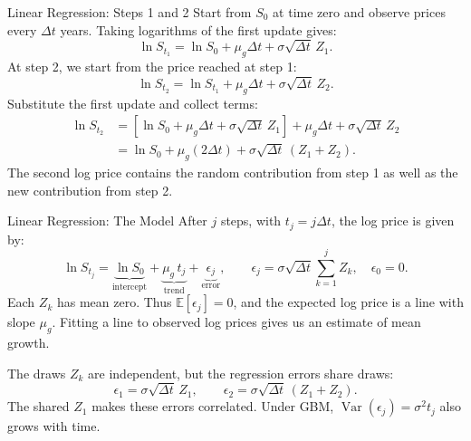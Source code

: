 \documentclass[aspectratio=169,11pt]{beamer}
\newcommand{\E}{\mathbb{E}}
\newcommand{\Var}{\operatorname{Var}}
\newcommand{\mug}{\mu_g}
\begin{document}
\begin{frame}{Linear Regression: Steps 1 and 2}
  Start from $S_0$ at time zero and observe prices every $\Delta t$ years.
  Taking logarithms of the first update gives:
  \[
    \ln S_{t_1}=\ln S_0+\mug\Delta t+\sigma\sqrt{\Delta t}\,Z_1.
  \]
  At step 2, we start from the price reached at step 1:
  \[
    \ln S_{t_2}=\ln S_{t_1}+\mug\Delta t+\sigma\sqrt{\Delta t}\,Z_2.
  \]
  Substitute the first update and collect terms:
  \[
    \begin{aligned}
      \ln S_{t_2}
      &=\left[\ln S_0+\mug\Delta t+\sigma\sqrt{\Delta t}\,Z_1\right]
        +\mug\Delta t+\sigma\sqrt{\Delta t}\,Z_2\\
      &=\ln S_0+\mug(2\Delta t)+\sigma\sqrt{\Delta t}\,(Z_1+Z_2).
    \end{aligned}
  \]
  The second log price contains the random contribution from step 1
  as well as the new contribution from step 2.
\end{frame}

\begin{frame}{Linear Regression: The Model}
  After $j$ steps, with $t_j=j\Delta t$, the log price is given by:
  \[
    \ln S_{t_j}
    =\underbrace{\ln S_0}_{\text{intercept}}
    +\underbrace{\mug\,t_j}_{\text{trend}}
    +\underbrace{\epsilon_j}_{\text{error}},
    \qquad
    \epsilon_j=\sigma\sqrt{\Delta t}\sum_{k=1}^{j}Z_k,\quad \epsilon_0=0.
  \]
  Each $Z_k$ has mean zero. Thus $\E[\epsilon_j]=0$, and the expected log
  price is a line with slope $\mug$. Fitting a line to observed log prices
  gives us an estimate of mean growth.

  \vspace{0.5em}
  The draws $Z_k$ are independent, but the regression errors share draws:
  \[
    \epsilon_1=\sigma\sqrt{\Delta t}\,Z_1,
    \qquad \epsilon_2=\sigma\sqrt{\Delta t}\,(Z_1+Z_2).
  \]
  The shared $Z_1$ makes these errors correlated. Under GBM,
  $\Var(\epsilon_j)=\sigma^2t_j$ also grows with time.
\end{frame}
\end{document}
